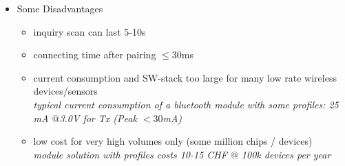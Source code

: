\begin{itemize}
\begin{itemize}
	\end{itemize}
	\item Some Disadvantages
	\begin{itemize}
		\item inquiry scan can last 5-10s 
		\item connecting time after pairing $\leq 30$ms
		\item current consumption and SW-stack too large for many low rate wireless devices/sensors \\
		\textit{typical current consumption of a bluetooth module with some profiles: 25 mA $@$3.0V for Tx (Peak $< 30$mA)}
		\item low cost for very high volumes only (some million chips / devices)  \\
		\textit{module solution with profiles costs 10-15 CHF $@$ 100k devices per year}
	\end{itemize}
\end{itemize}

